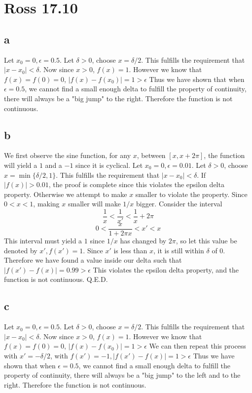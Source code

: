 \documentclass[12pt]{article}
\begin{document}
\section{Ross 17.10}
\subsection{a}
Let $x_0 = 0, \epsilon = 0.5$. Let $\delta > 0$, choose $x = \delta/2$. This fulfills the requirement that $|x-x_0|<\delta$. Now since $x>0$, $f(x) = 1$. However we know that $f(x)=f(0)=0$, $|f(x)-f(x_0)|=1  > \epsilon$
\newline
Thus we have shown that when $\epsilon = 0.5$, we cannot find a small enough delta to fulfill the property of continuity, there will always be a "big jump" to the right. Therefore the function is not continuous.

\subsection{b}
We first observe the sine function, for any $x$, between $[x, x+2\pi]$, the function will yield a $1$ and a $-1$ since it is cyclical.
\newline
Let $x_0 = 0, \epsilon = 0.01$. Let $\delta > 0$, choose $x = \min\{\delta/2, 1\}$. This fulfills the requirement that $|x-x_0|<\delta$. If $|f(x)|>0.01$, the proof is complete since this violates the epsilon delta property.
\newline
Otherwise we attempt to make $x$ smaller to violate the property. Since $0<x<1$, making $x$ smaller will make $1/x$ bigger. Consider the interval $$\frac{1}{x}<\frac{1}{x'}<\frac{1}{x}+2\pi$$
$$0<\frac{x}{1+2\pi x}<x'<x$$
This interval must yield a $1$ since $1/x$ has changed by $2\pi$, so let this value be denoted by $x', f(x')=1$. Since $x'$ is less than $x$, it is still within $\delta$ of 0. Therefore we have found a value inside our delta such that $|f(x')-f(x)|=0.99>\epsilon$
\newline
This violates the epsilon delta property, and the function is not continuous. Q.E.D.

\subsection{c}
Let $x_0 = 0, \epsilon = 0.5$. Let $\delta > 0$, choose $x = \delta/2$. This fulfills the requirement that $|x-x_0|<\delta$. Now since $x>0$, $f(x) = 1$. However we know that $f(x)=f(0)=0$, $|f(x)-f(x_0)|=1  > \epsilon$
\newline
We can then repeat this process with $x' = -\delta/2$, with $f(x')=-1, |f(x')-f(x)|=1>\epsilon$
\newline
Thus we have shown that when $\epsilon = 0.5$, we cannot find a small enough delta to fulfill the property of continuity, there will always be a "big jump" to the left and to the right. Therefore the function is not continuous.
\end{document}
